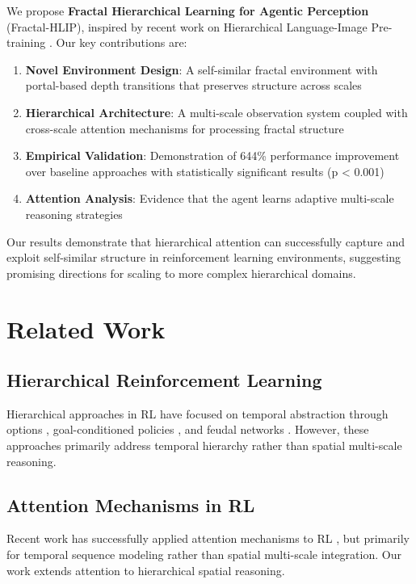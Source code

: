 \documentclass[11pt]{article}
\begin{document}
We propose \textbf{Fractal Hierarchical Learning for Agentic Perception} (Fractal-HLIP), inspired by recent work on Hierarchical Language-Image Pre-training \cite{wang2022hlip}. Our key contributions are:

\begin{enumerate}
    \item \textbf{Novel Environment Design}: A self-similar fractal environment with portal-based depth transitions that preserves structure across scales
    \item \textbf{Hierarchical Architecture}: A multi-scale observation system coupled with cross-scale attention mechanisms for processing fractal structure
    \item \textbf{Empirical Validation}: Demonstration of 644\% performance improvement over baseline approaches with statistically significant results (p < 0.001)
    \item \textbf{Attention Analysis}: Evidence that the agent learns adaptive multi-scale reasoning strategies
\end{enumerate}

Our results demonstrate that hierarchical attention can successfully capture and exploit self-similar structure in reinforcement learning environments, suggesting promising directions for scaling to more complex hierarchical domains.

\section{Related Work}

\subsection{Hierarchical Reinforcement Learning}
Hierarchical approaches in RL have focused on temporal abstraction through options \cite{sutton1999options}, goal-conditioned policies \cite{andrychowicz2017hindsight}, and feudal networks \cite{vezhnevets2017feudal}. However, these approaches primarily address temporal hierarchy rather than spatial multi-scale reasoning.

\subsection{Attention Mechanisms in RL}
Recent work has successfully applied attention mechanisms to RL \cite{mnih2014attention, tang2019attention}, but primarily for temporal sequence modeling rather than spatial multi-scale integration. Our work extends attention to hierarchical spatial reasoning.
\end{document}
